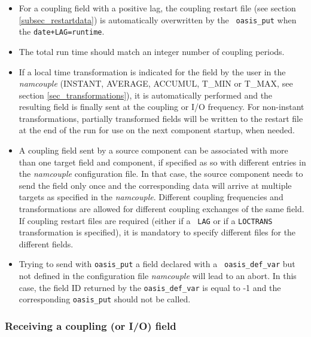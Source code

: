 \begin{itemize}
\item For a coupling
  field with a positive lag, the coupling restart file (see section
  \ref{subsec_restartdata}) is automatically overwritten by the {\tt
    oasis\_put} when the {\tt date+LAG=runtime}.


\item The total run time should match an integer number of coupling
  periods.

\item If a local time transformation is indicated for the field by the
  user in the {\it namcouple} (INSTANT, AVERAGE, ACCUMUL, T\_MIN or
  T\_MAX, see section \ref{sec_transformations}), it is automatically
  performed and the resulting field is finally sent at the coupling or
  I/O frequency.  For non-instant transformations, partially
  transformed fields will be written to the restart file at the end of
  the run for use on the next component startup, when needed.

\item A coupling field sent by a source component can be
  associated with more than one target field and component, if specified
  as so with different entries in the {\it namcouple} configuration
  file. In that case, the source component needs to send the field only
  once and the corresponding data will arrive at multiple targets as
  specified in the {\it namcouple}. Different coupling frequencies and
  transformations are allowed for different coupling exchanges of the
  same field. If coupling restart files are required (either if a {\tt
    LAG} or if a {\tt LOCTRANS} transformation is specified), it is
  mandatory to specify different files for the different fields.

\item Trying to send with {\tt oasis\_put} a field declared with a {\tt
  oasis\_def\_var} but not defined in the configuration file {\it
  namcouple} will lead to an abort. In this case, the field ID
returned by the {\tt oasis\_def\_var} is equal to -1 and the
corresponding {\tt oasis\_put} should not be called. 

\end{itemize}

\subsubsection{Receiving a coupling (or I/O) field}

